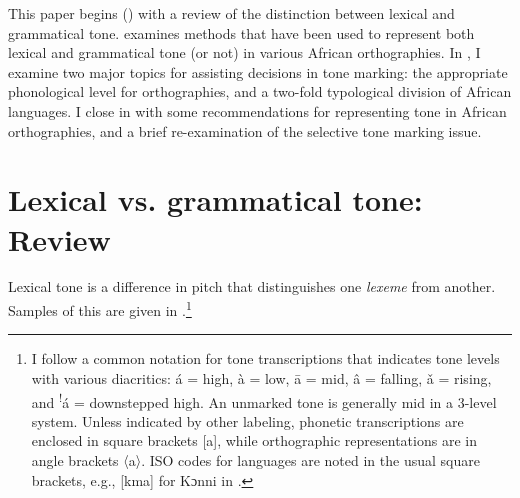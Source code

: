 \documentclass[output=paper]{langscibook}
\begin{document}
This paper begins () with a review of the distinction between lexical and grammatical tone.  examines methods that have been used to represent both lexical and grammatical tone (or not) in various African orthographies. In , I examine two major topics for assisting decisions in tone marking: the appropriate phonological level for orthographies, and a two-fold typological division of African languages. I close in  with some recommendations for representing tone in African orthographies, and a brief re-examination of the selective tone marking issue.

\section{Lexical vs. grammatical tone: Review}
\label{sec:LexicalVgrammaticalTone:2}
Lexical tone is a difference in pitch that distinguishes one \textit{lexeme} from another. Samples of this are given in .\footnote{I follow a common notation for tone transcriptions that indicates tone levels with various diacritics: á = high, à = low, ā = mid, â = falling, ǎ = rising, and \textsuperscript{!}á = downstepped high. An unmarked tone is generally mid in a 3-level system. Unless indicated by other labeling, phonetic transcriptions are enclosed in square brackets [a], while orthographic representations are in angle brackets 〈a〉. ISO codes for languages are noted in the usual square brackets, e.g., [kma] for Kɔnni in .}
\end{document}
